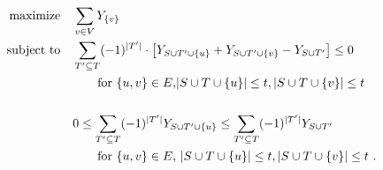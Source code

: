 \documentclass[a4paper,twoside,justified]{tufte-handout}
\begin{document}
\begin{alignat*}{2}
  \text{maximize}\hspace{1em}& \sum_{v\in V} Y_{\{v\}}\notag \\
  \text{subject to}\hspace{1em}& \sum_{T'\subseteq T} (-1)^{|T'|} \cdot 
  \left[ 
    Y_{S\cup T'\cup \{u\} } + Y_{S\cup T'\cup \{v\} } - Y_{S\cup T'}
  \right]
  \leq 0 \\ 
  &\qquad \text{for $ \{u,v\}\in E $,$ |S\cup T\cup \{u\}| \leq
    t,|S\cup T\cup \{v\}|\leq t $}\\
  \\
  &0 \leq \sum_{T'\subseteq T} (-1)^{|T'|} Y_{S\cup T'\cup \{u\} } \leq
  \sum_{T'\subseteq T} (-1)^{|T'|} Y_{S\cup T' }\\
  &\qquad \text{for $ \{u,v\}\in E $, $|S\cup T\cup \{u\}| \leq
    t,|S\cup T\cup \{v\}|\leq t $  }.
\end{alignat*}




\end{document}
